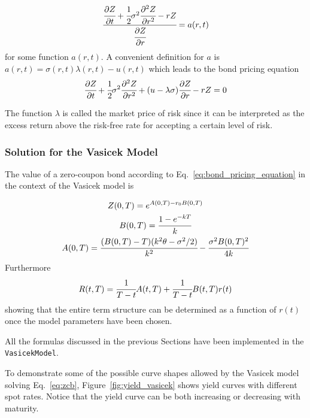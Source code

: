 \begin{equation*}
\cfrac{\cfrac{\partial Z}{\partial t} + \cfrac{1}{2}\sigma^2 \cfrac{\partial^2 Z}{\partial r^2} - rZ}{\cfrac{\partial Z}{\partial r}}= a(r, t)
\end{equation*}
for some function $a(r, t)$. A convenient definition for $a$ is $a(r, t) = \sigma(r, t)\lambda(r, t)-u(r, t)$ which leads to the bond pricing equation
\begin{equation}
\cfrac{\partial Z}{\partial t} + \cfrac{1}{2}\sigma^2 \cfrac{\partial^2 Z}{\partial r^2} + (u-\lambda\sigma)\cfrac{\partial Z}{\partial r}-rZ = 0
\label{eq:bond_pricing_equation}
\end{equation}

The function $\lambda$ is called the market price of risk since it can be interpreted as the excess return above the risk-free rate for accepting a certain level of risk.

\subsubsection{Solution for the Vasicek Model}
\label{solution-for-the-vasicek-model}
The value of a zero-coupon bond according to Eq.~\ref{eq:bond_pricing_equation} in the context of the Vasicek model is

\begin{equation} 
\begin{gathered}
Z(0, T) = e^{A(0,T)-r_0 B(0,T)} \\
B(0, T) = \cfrac{1-e^{-kT}}{k}\\
A(0, T) = \cfrac{(B(0, T)-T)(k^2\theta - \sigma^2/2)}{k^2} - \cfrac{\sigma^2 B(0, T)^2}{4k}
\label{eq:zcb_vasicek}
\end{gathered}
\end{equation}
Furthermore
\begin{equation}
R(t, T) = \cfrac{1}{T-t} A(t,T)+\cfrac{1}{T-t}B(t, T)r(t)
\label{eq:term_structure_vasicek}
\end{equation}
showing that the entire term structure can be determined as a function of $r(t)$ once the model parameters have been chosen.

All the formulas discussed in the previous Sections have been implemented in the \texttt{VasicekModel}.

To demonstrate some of the possible curve shapes allowed by the Vasicek model solving Eq.~\ref{eq:zcb}, Figure~\ref{fig:yield_vasicek} shows yield curves with different spot rates. Notice that the yield curve can be both increasing or decreasing with maturity.

